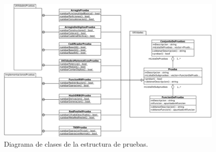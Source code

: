 \begin{figure}
  \begin{center}
    \includegraphics[width=1.0\linewidth]{diagramas/pruebas.png}
    \caption{Diagrama de clases de la estructura de pruebas.}
    \label{clases_pruebas}
  \end{center}
\end{figure}
